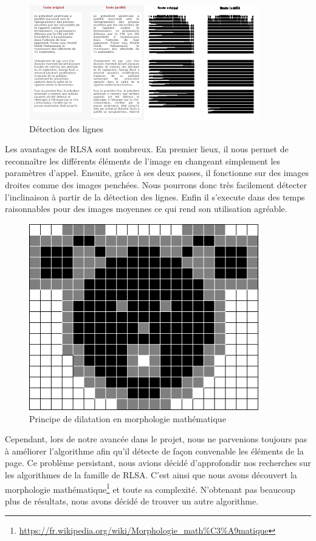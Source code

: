 \documentclass[11pt]{report}
\begin{document}
\begin{figure}[htbp]
\centering
\includegraphics[width=10cm]{rlsa.png}
\caption{Détection des lignes}
\end{figure}

Les avantages de RLSA sont nombreux. En premier lieux, il nous permet de reconnaître les différents éléments de l'image en changeant simplement les paramètres d'appel. Ensuite, grâce à ses deux passes, il fonctionne sur des images droites comme des images penchées. Nous pourrons donc très facilement détecter l'inclinaison à partir de la détection des lignes. Enfin il s'execute dans des temps raisonnables pour des images moyennes ce qui rend son utilisation agréable.

\begin{figure}[htbp]
\centering
\includegraphics[width=10cm]{dilatation.png}
\caption{Principe de dilatation en morphologie mathématique}
\end{figure}

Cependant, lors de notre avancée dans le projet, nous ne parvenions toujours pas à améliorer l'algorithme afin qu'il détecte de façon convenable les éléments de la page. Ce problème persistant, nous avions décidé d'approfondir nos recherches sur les algorithmes de la famille de RLSA. C'est ainsi que nous avons découvert la morphologie mathématique\footnote{\url{https://fr.wikipedia.org/wiki/Morphologie_math\%C3\%A9matique}} et toute sa complexité. N'obtenant pas beaucoup plus de résultats, nous avons décidé de trouver un autre algorithme.
\end{document}
